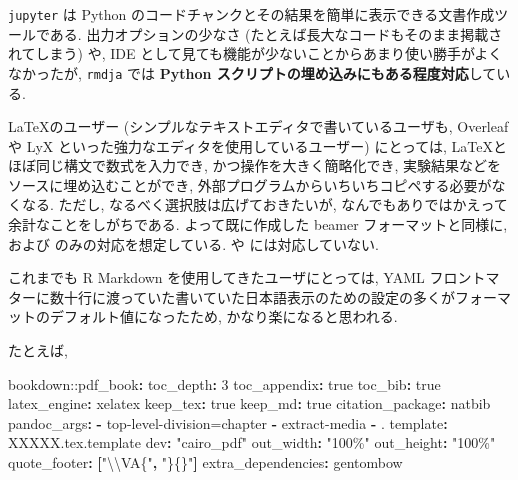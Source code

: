 \documentclass[
]{bxjsbook}
\newenvironment{Shaded}{\begin{snugshade}}{\end{snugshade}}
\newcommand{\AttributeTok}[1]{\textcolor[rgb]{0.77,0.63,0.00}{#1}}
\newcommand{\CharTok}[1]{\textcolor[rgb]{0.31,0.60,0.02}{#1}}
\newcommand{\DecValTok}[1]{\textcolor[rgb]{0.00,0.00,0.81}{#1}}
\newcommand{\FunctionTok}[1]{\textcolor[rgb]{0.00,0.00,0.00}{#1}}
\newcommand{\KeywordTok}[1]{\textcolor[rgb]{0.13,0.29,0.53}{\textbf{#1}}}
\newcommand{\SpecialCharTok}[1]{\textcolor[rgb]{0.00,0.00,0.00}{#1}}
\newcommand{\StringTok}[1]{\textcolor[rgb]{0.31,0.60,0.02}{#1}}
\theoremstyle{definition}
\theoremstyle{definition}
\theoremstyle{definition}
\theoremstyle{remark}
\begin{document}
\texttt{jupyter} は Python
のコードチャンクとその結果を簡単に表示できる文書作成ツールである.
出力オプションの少なさ (たとえば長大なコードもそのまま掲載されてしまう)
や, IDE として見ても機能が少ないことからあまり使い勝手がよくなかったが,
\texttt{rmdja} では \textbf{Python
スクリプトの埋め込みにもある程度対応}している.

\LaTeX のユーザー (シンプルなテキストエディタで書いているユーザも,
Overleaf や LyX といった強力なエディタを使用しているユーザー)
にとっては, \LaTeX とほぼ同じ構文で数式を入力でき,
かつ操作を大きく簡略化でき, 実験結果などをソースに埋め込むことができ,
外部プログラムからいちいちコピペする必要がなくなる. ただし,
なるべく選択肢は広げておきたいが,
なんでもありではかえって余計なことをしがちである. よって既に作成した
beamer フォーマットと同様に, \XeLaTeX および
\LuaLaTeX のみの対応を想定している. \pLaTeX や
\upLaTeX には対応していない.

これまでも R Markdown を使用してきたユーザにとっては, YAML
フロントマターに数十行に渡っていた書いていた日本語表示のための設定の多くがフォーマットのデフォルト値になったため,
かなり楽になると思われる.

たとえば,

\begin{Shaded}
\begin{Highlighting}[]
\AttributeTok{bookdown:}\FunctionTok{:pdf\_book}\KeywordTok{:}
\AttributeTok{  }\FunctionTok{toc\_depth}\KeywordTok{:}\AttributeTok{ }\DecValTok{3}
\AttributeTok{  }\FunctionTok{toc\_appendix}\KeywordTok{:}\AttributeTok{ }\CharTok{true}
\AttributeTok{  }\FunctionTok{toc\_bib}\KeywordTok{:}\AttributeTok{ }\CharTok{true}
\AttributeTok{  }\FunctionTok{latex\_engine}\KeywordTok{:}\AttributeTok{ xelatex}
\AttributeTok{  }\FunctionTok{keep\_tex}\KeywordTok{:}\AttributeTok{ }\CharTok{true}
\AttributeTok{  }\FunctionTok{keep\_md}\KeywordTok{:}\AttributeTok{ }\CharTok{true}
\AttributeTok{  }\FunctionTok{citation\_package}\KeywordTok{:}\AttributeTok{ natbib}
\AttributeTok{  }\FunctionTok{pandoc\_args}\KeywordTok{:}
\AttributeTok{    }\KeywordTok{{-}}\AttributeTok{ }\StringTok{\textquotesingle{}{-}{-}top{-}level{-}division=chapter\textquotesingle{}}
\AttributeTok{    }\KeywordTok{{-}}\AttributeTok{ }\StringTok{\textquotesingle{}{-}{-}extract{-}media\textquotesingle{}}
\AttributeTok{    }\KeywordTok{{-}}\AttributeTok{ }\StringTok{\textquotesingle{}.\textquotesingle{}}
\AttributeTok{  }\FunctionTok{template}\KeywordTok{:}\AttributeTok{ XXXXX.tex.template\textquotesingle{}}
\AttributeTok{  }\FunctionTok{dev}\KeywordTok{:}\AttributeTok{ }\StringTok{"cairo\_pdf"}
\AttributeTok{  }\FunctionTok{out\_width}\KeywordTok{:}\AttributeTok{ }\StringTok{"100\%"}
\AttributeTok{  }\FunctionTok{out\_height}\KeywordTok{:}\AttributeTok{ }\StringTok{"100\%"}
\AttributeTok{  }\FunctionTok{quote\_footer}\KeywordTok{:}\AttributeTok{ }\KeywordTok{[}\StringTok{"}\SpecialCharTok{\textbackslash{}\textbackslash{}}\StringTok{VA\{"}\KeywordTok{,}\AttributeTok{ }\StringTok{"\}\{\}"}\KeywordTok{]}
\AttributeTok{  }\FunctionTok{extra\_dependencies}\KeywordTok{:}\AttributeTok{ gentombow}
\end{Highlighting}
\end{Shaded}
\end{document}

